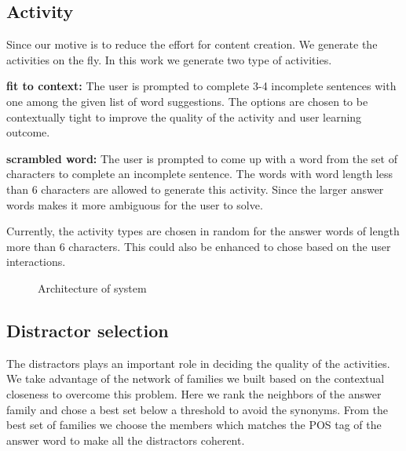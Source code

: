 \documentclass[11pt,a4paper]{article}
\begin{document}
\subsection{Activity}
Since our motive is to reduce the effort for content creation. We generate the
activities on the fly. In this work we generate two type of activities. 

\textbf{fit to context:} The user is prompted to complete 3-4 incomplete
sentences with one among the given list of word suggestions. The options are
chosen to be contextually tight to improve the quality of the activity and
user learning outcome.

\textbf{scrambled word:} The user is prompted to come up with a word from the
set of characters to complete an incomplete sentence. The words with word length
less than 6 characters are allowed to generate this activity. Since the larger
answer words makes it more ambiguous for the user to solve.

Currently, the activity types are chosen in random for the answer words of length
more than 6 characters. This could also be enhanced to chose based on the user
interactions.

\begin{figure}
\begin{tcbraster}[raster columns=1, enhanced, blankest]
\caption{Architecture of system}

\end{tcbraster}
\end{figure}

\subsection{Distractor selection}
The distractors plays an important role in deciding the quality of the activities.
We take advantage of the network of families we built based on the contextual
closeness to overcome this problem. Here we rank the neighbors of the
answer family and chose a best set below a threshold to avoid the synonyms. From
the best set of families we choose the members which matches the POS tag of the
answer word to make all the distractors coherent.
\end{document}
